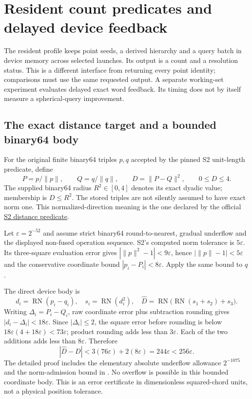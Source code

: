 \section{Resident count predicates and delayed device feedback}
\label{sec:r15-resident-gpu}
The resident profile keeps point seeds, a derived hierarchy and a query batch
in device memory across selected launches. Its output is a count and a
resolution status. This is a different interface from returning every point
identity; comparisons must use the same requested output. A separate
working-set experiment evaluates delayed exact word feedback. Its timing
does not by itself measure a spherical-query improvement.

\subsection{The exact distance target and a bounded binary64 body}
For the original finite binary64 triples $p,q$ accepted by the pinned S2
unit-length predicate, define
\begin{equation}
 P=p/\|p\|,\qquad Q=q/\|q\|,\qquad
 D=\|P-Q\|^2,\qquad 0\le D\le4.
 \label{eq:r15-resident-target}
\end{equation}
The supplied binary64 radius $R^2\in[0,4]$ denotes its exact dyadic value;
membership is $D\le R^2$. The stored triples are not silently assumed to
have exact norm one. This normalized-direction meaning is the one declared
by the official
\href{https://github.com/google/s2geometry/blob/079611b654ad89afd9c3c3a1796d64bdd6a6b340/src/s2/s2predicates.h}
{S2 distance predicate}.

Let $\varepsilon=2^{-52}$ and assume strict binary64 round-to-nearest,
gradual underflow and the displayed non-fused operation sequence. S2's
computed norm tolerance is $5\varepsilon$. Its three-square evaluation error
gives $|\|p\|^2-1|<9\varepsilon$, hence
$|\|p\|-1|<5\varepsilon$ and the conservative coordinate bound
$|p_i-P_i|<8\varepsilon$. Apply the same bound to $q$.

The direct device body is
\begin{equation}
 d_i=\operatorname{RN}(p_i-q_i),\quad
 s_i=\operatorname{RN}(d_i^2),\quad
 \widehat D=\operatorname{RN}
       \bigl(\operatorname{RN}(s_1+s_2)+s_3\bigr).
 \label{eq:r15-resident-distance}
\end{equation}
Writing $\Delta_i=P_i-Q_i$, raw coordinate error plus subtraction rounding
gives $|d_i-\Delta_i|<18\varepsilon$. Since $|\Delta_i|\le2$,
the square error before rounding is below
$18\varepsilon(4+18\varepsilon)<73\varepsilon$; product rounding adds less
than $3\varepsilon$. Each of the two additions adds less than
$8\varepsilon$. Therefore
\begin{equation}
 |\widehat D-D|<3(76\varepsilon)+2(8\varepsilon)
             =244\varepsilon<256\varepsilon.
 \label{eq:r15-resident-error}
\end{equation}
The detailed proof includes the elementary absolute underflow allowance
$2^{-1075}$ and the norm-admission bound in
. No overflow is possible in this
bounded coordinate body. This is an error certificate in dimensionless
squared-chord units, not a physical position tolerance.

